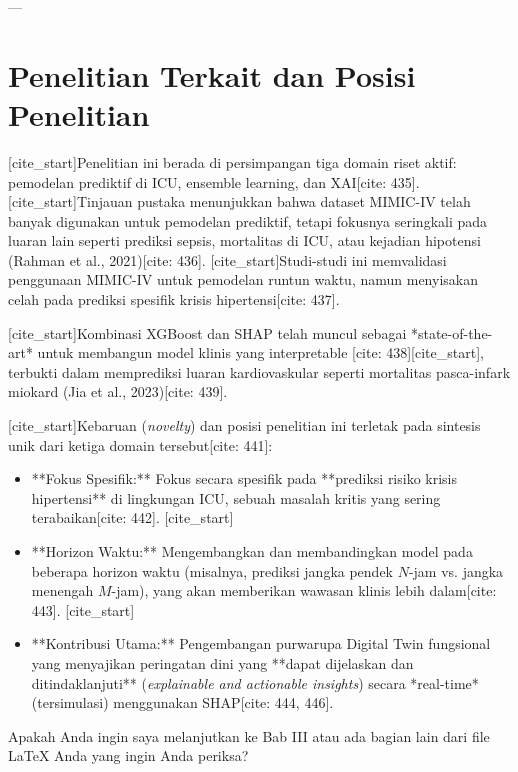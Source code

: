 ---
\section{Penelitian Terkait dan Posisi Penelitian}
[cite_start]Penelitian ini berada di persimpangan tiga domain riset aktif: pemodelan prediktif di ICU, ensemble learning, dan XAI[cite: 435]. [cite_start]Tinjauan pustaka menunjukkan bahwa dataset MIMIC-IV telah banyak digunakan untuk pemodelan prediktif, tetapi fokusnya seringkali pada luaran lain seperti prediksi sepsis, mortalitas di ICU, atau kejadian hipotensi (Rahman et al., 2021)[cite: 436]. [cite_start]Studi-studi ini memvalidasi penggunaan MIMIC-IV untuk pemodelan runtun waktu, namun menyisakan celah pada prediksi spesifik krisis hipertensi[cite: 437].

[cite_start]Kombinasi XGBoost dan SHAP telah muncul sebagai *state-of-the-art* untuk membangun model klinis yang interpretable [cite: 438][cite_start], terbukti dalam memprediksi luaran kardiovaskular seperti mortalitas pasca-infark miokard (Jia et al., 2023)[cite: 439].

[cite_start]Kebaruan (\textit{novelty}) dan posisi penelitian ini terletak pada sintesis unik dari ketiga domain tersebut[cite: 441]:
\begin{itemize}
    [cite_start]\item **Fokus Spesifik:** Fokus secara spesifik pada **prediksi risiko krisis hipertensi** di lingkungan ICU, sebuah masalah kritis yang sering terabaikan[cite: 442].
    [cite_start]\item **Horizon Waktu:** Mengembangkan dan membandingkan model pada beberapa horizon waktu (misalnya, prediksi jangka pendek $N$-jam vs. jangka menengah $M$-jam), yang akan memberikan wawasan klinis lebih dalam[cite: 443].
    [cite_start]\item **Kontribusi Utama:** Pengembangan purwarupa Digital Twin fungsional yang menyajikan peringatan dini yang **dapat dijelaskan dan ditindaklanjuti** (\textit{explainable and actionable insights}) secara *real-time* (tersimulasi) menggunakan SHAP[cite: 444, 446].
\end{itemize}

Apakah Anda ingin saya melanjutkan ke Bab III atau ada bagian lain dari file LaTeX Anda yang ingin Anda periksa?